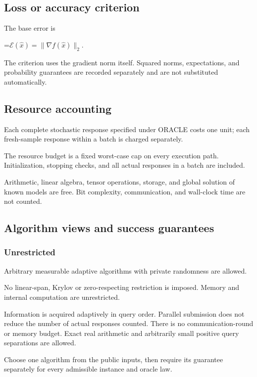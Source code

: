 \documentclass[10pt,a4paper]{article}
\newcommand{\AtlasMath}[1]{\par\begingroup\centering\setbox0=\hbox{$\displaystyle #1$}\ifdim\wd0>1.4\linewidth\typeout{ATLAS WIDE FORMULA: \the\wd0}\fi\ifdim\wd0>\linewidth\resizebox{\linewidth}{!}{\box0}\else\box0\fi\par\endgroup}
\begin{document}
\subsection{Loss or accuracy criterion}
The base error is


\AtlasMath{\mathcal{E}(\widehat{x})=\|\nabla f(\widehat{x})\|_2.}


The criterion uses the gradient norm itself. Squared norms, expectations, and probability guarantees are recorded separately and are not substituted automatically.

\subsection{Resource accounting}
Each complete stochastic response specified under ORACLE costs one unit; each fresh-sample response within a batch is charged separately.

The resource budget is a fixed worst-case cap on every execution path. Initialization, stopping checks, and all actual responses in a batch are included.

Arithmetic, linear algebra, tensor operations, storage, and global solution of known models are free. Bit complexity, communication, and wall-clock time are not counted.

\subsection{Algorithm views and success guarantees}
\subsubsection{Unrestricted}
Arbitrary measurable adaptive algorithms with private randomness are allowed.

No linear-span, Krylov or zero-respecting restriction is imposed. Memory and internal computation are unrestricted.

Information is acquired adaptively in query order. Parallel submission does not reduce the number of actual responses counted. There is no communication-round or memory budget. Exact real arithmetic and arbitrarily small positive query separations are allowed.

Choose one algorithm from the public inputs, then require its guarantee separately for every admissible instance and oracle law.
\end{document}
